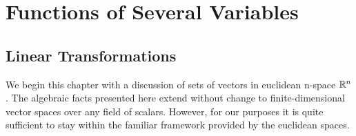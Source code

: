 
\chapter{Functions of Several Variables}
\label{chap:rudin9}

\section{Linear Transformations}

We begin this chapter with a discussion of sets of vectors in
euclidean n-space $\mathbb{R}^n$. The algebraic facts presented here extend
without change to finite-dimensional vector spaces over any field of
scalars. However, for our purposes it is quite sufficient to stay
within the familiar framework provided by the euclidean spaces.


